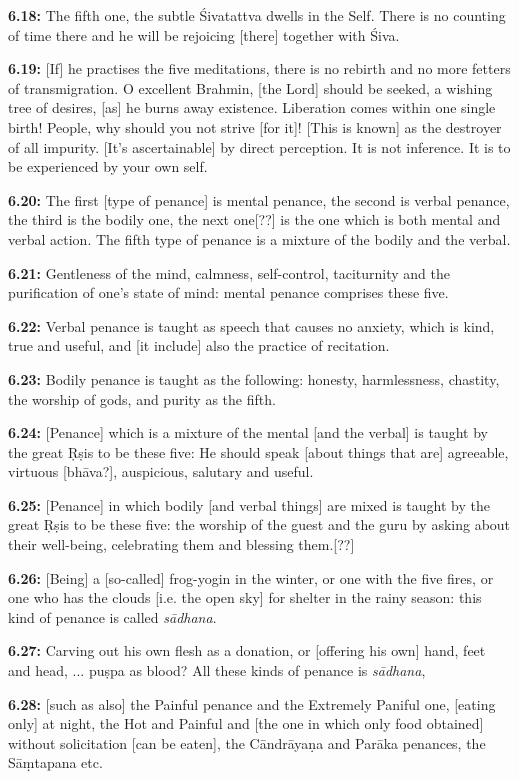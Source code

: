 \documentclass{article}
\newcommand{\vsnum}[1]{\textbf{#1}}
\newcommand{\skt}[1]{\textit{#1}}
\begin{document}
\vsnum{6.18: }The fifth one, the subtle Śivatattva dwells in the Self. There is no counting of time there and he will be rejoicing [there] together with Śiva.

\vsnum{6.19: }[If] he practises the five meditations, there is no rebirth and no more fetters of transmigration. O excellent Brahmin, [the Lord] should be seeked, a wishing tree of desires, [as] he burns away existence. Liberation comes within one single birth! People, why should you not strive [for it]! [This is known] as the destroyer of all impurity. [It's ascertainable] by direct perception. It is not inference. It is to be experienced by your own self.

\vsnum{6.20: }The first [type of penance] is mental penance, the second is verbal penance, the third is the bodily one, the next one[??] is the one which is both mental and verbal action. The fifth type of penance is a mixture of the bodily and the verbal.

\vsnum{6.21: }Gentleness of the mind, calmness, self-control, taciturnity and the purification of one's state of mind: mental penance comprises these five.

\vsnum{6.22: }Verbal penance is taught as speech that causes no anxiety, which is kind, true and useful, and [it include] also the practice of recitation.

\vsnum{6.23: }Bodily penance is taught as the following: honesty, harmlessness, chastity, the worship of gods, and purity as the fifth.

\vsnum{6.24: }[Penance] which is a mixture of the mental [and the verbal] is taught by the great Ṛṣis to be these five: He should speak [about things that are] agreeable, virtuous [bhāva?], auspicious, salutary and useful.

\vsnum{6.25: }[Penance] in which bodily [and verbal things] are mixed is taught by the great Ṛṣis to be these five: the worship of the guest and the guru by asking about their well-being, celebrating them and blessing them.[??]

\vsnum{6.26: }[Being] a [so-called] frog-yogin in the winter, or one with the five fires, or one who has the clouds [i.e. the open sky] for shelter in the rainy season: this kind of penance is called \skt{sādhana}.

\vsnum{6.27: }Carving out his own flesh as a donation, or [offering his own] hand, feet and head, ... puṣpa as blood? All these kinds of penance is \skt{sādhana},

\vsnum{6.28: }[such as also] the Painful penance and the Extremely Paniful one, [eating only] at night, the Hot and Painful and [the one in which only food obtained] without solicitation [can be eaten], the Cāndrāyaṇa and Parāka penances, the Sāṃtapana etc. 
\end{document}
